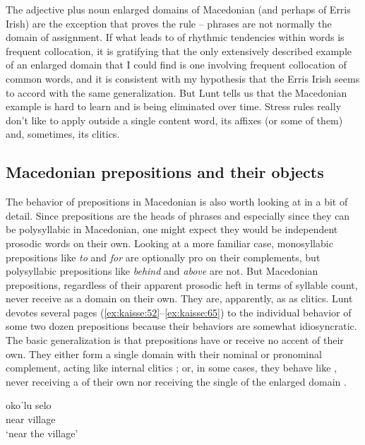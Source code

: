 \documentclass[output=paper,
modfonts
]{LSP/langsci}
\begin{document}
\begin{exe}
The adjective plus noun enlarged domains of Macedonian (and perhaps of Erris Irish) are the exception that proves the rule -- phrases are not normally the domain of  assignment. If what leads to  of rhythmic tendencies within words is frequent collocation, it is gratifying that the only extensively described example of an enlarged domain that I could find is one involving frequent collocation of common words, and it is consistent with my hypothesis that the Erris Irish seems to accord with the same generalization. But Lunt tells us that the Macedonian example is hard to learn and is being eliminated over time. Stress rules really don’t like to apply outside a single content word, its affixes (or some of them) and, sometimes, its clitics. 

\subsection[Macedonian prepositions and their objects]{Macedonian prepositions and their objects}\label{sec:kaisse:4.4}

The  behavior of prepositions in Macedonian is also worth looking at in a bit of detail. Since prepositions are the heads of phrases and especially since they can be polysyllabic in Macedonian, one might expect they would be independent prosodic words on their own. Looking at a more familiar case,  monosyllabic prepositions like \textit{to} and\textit{ for} are optionally pro on their complements, but polysyllabic prepositions like \textit{behind} and \textit{above} are not. But Macedonian prepositions, regardless of their apparent prosodic heft in terms of syllable count, never receive  as a domain on their own. They are, apparently, as  as clitics. Lunt devotes several pages (\ref{ex:kaisse:52}--\ref{ex:kaisse:65}) to the individual behavior of some two dozen prepositions because their  behaviors are somewhat idiosyncratic. The basic generalization is that prepositions have or receive no accent of their own. They either form a single  domain with their nominal or pronominal complement, acting like internal clitics ; or, in some cases, they behave like , never receiving a  of their own nor receiving the single  of the enlarged domain . 

\ea \label{ex:kaisse:20}  \citep{franks1989}
	\ea \label{ex:kaisse:20a} \gll okoˈlu selo\\
	near village\\
	\glt  `near the village'


\end{exe}
\end{document}
